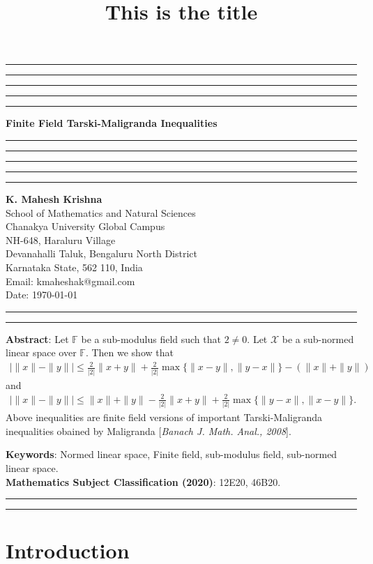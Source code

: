 \documentclass{amsart}
\title{This is the title}
\begin{document}
\hrule\hrule\hrule\hrule\hrule
\vspace{0.3cm}	
\begin{center}
{\bf\large{{Finite Field Tarski-Maligranda Inequalities}}}\\
\vspace{0.3cm}
\hrule\hrule\hrule\hrule\hrule
\vspace{0.3cm}
\textbf{K. Mahesh Krishna}\\
School of Mathematics and Natural Sciences\\
Chanakya University Global Campus\\
NH-648, Haraluru Village\\
Devanahalli Taluk, 	Bengaluru  North District\\
Karnataka State, 562 110, India\\
Email: kmaheshak@gmail.com\\

Date: \today
\end{center}

\hrule\hrule
\vspace{0.5cm}
\textbf{Abstract}: Let $\mathbb{F}$ be a sub-modulus field such that $2 \neq 0$. Let $\mathcal{X}$ be a sub-normed linear space over $\mathbb{F}$. Then we show that 
	\begin{align*}
	\bigg|\|x\|-\|y\|\bigg|\leq  \frac{2}{|2|}\|x+y\|+\frac{2}{|2|}\max\{\|x-y\|, \|y-x\|\}-(\|x\|+\|y\|)
\end{align*}
and 
\begin{align*}
	\bigg|\|x\|-\|y\|\bigg|\leq \|x\|+\|y\|-\frac{2}{|2|}\|x+y\|+\frac{2}{|2|}\max\{\|y-x\|, \|x-y\|\}.
\end{align*}
Above inequalities are finite field versions of important Tarski-Maligranda inequalities obained by Maligranda [\textit{Banach J. Math. Anal., 2008}].

\textbf{Keywords}: Normed linear space, Finite field, sub-modulus field, sub-normed linear space.\\
\textbf{Mathematics Subject Classification (2020)}:  12E20, 46B20.\\

\hrule


\hrule
\section{Introduction}
\end{document}
